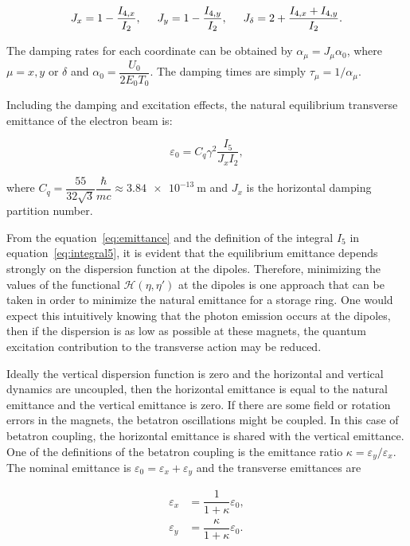 \begin{equation*}
    J_x = 1 - \dfrac{I_{4,x}}{I_2}, \hspace{0.5cm} J_y = 1 - \dfrac{I_{4,y}}{I_2}, \hspace{0.5cm} J_{\delta} = 2 + \dfrac{I_{4,x} + I_{4,y}}{I_2}.
\end{equation*}

The damping rates for each coordinate can be obtained by $\alpha_{\mu} = J_{\mu} \alpha_0$, where $\mu = x, y$ or $\delta$ and $\alpha_0 = \dfrac{U_0}{2E_0T_0}$. The damping times are simply $\tau_{\mu} = 1/\alpha_{\mu}$.

Including the damping and excitation effects, the natural equilibrium transverse emittance of the electron beam is:

\begin{equation}
    \varepsilon_0 = C_q \gamma^2 \dfrac{I_5}{J_x I_2},
    \label{eq:emittance}
\end{equation}

where $C_q = \dfrac{55}{32 \sqrt{3}}\dfrac{\hbar}{mc} \approx \SI{3.84e-13}{\metre}$ and $J_x$ is the horizontal damping partition number.

From the equation~\eqref{eq:emittance} and the definition of the integral $I_5$ in equation~\eqref{eq:integral5}, it is evident that the equilibrium emittance depends strongly on the dispersion function at the dipoles. Therefore, minimizing the values of the functional $\mathcal{H}(\eta, \eta')$ at the dipoles is one approach that can be taken in order to minimize the natural emittance for a storage ring. One would expect this intuitively knowing that the photon emission occurs at the dipoles, then if the dispersion is as low as possible at these magnets, the quantum excitation contribution to the transverse action may be reduced.

Ideally the vertical dispersion function is zero and the horizontal and vertical dynamics are uncoupled, then the horizontal emittance is equal to the natural emittance and the vertical emittance is zero. If there are some field or rotation errors in the magnets, the betatron oscillations might be coupled. In this case of betatron coupling, the horizontal emittance is shared with the vertical emittance. One of the definitions of the betatron coupling is the emittance ratio $\kappa = \varepsilon_y/\varepsilon_x$. The nominal emittance is $\varepsilon_0 = \varepsilon_x + \varepsilon_y$ and the transverse emittances are

\begin{align}
    \varepsilon_x &= \dfrac{1}{1 + \kappa}\varepsilon_0, \\
    \varepsilon_y &= \dfrac{\kappa}{1 + \kappa}\varepsilon_0.
\end{align}

